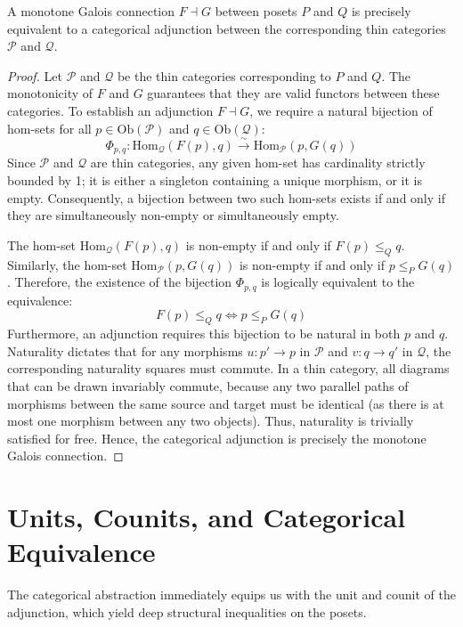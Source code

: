\begin{lemma}
\label{lem:adjunction_thin}
A monotone Galois connection $F \dashv G$ between posets $P$ and $Q$ is precisely equivalent to a categorical adjunction between the corresponding thin categories $\mathcal{P}$ and $\mathcal{Q}$.
\end{lemma}
\begin{proof}
Let $\mathcal{P}$ and $\mathcal{Q}$ be the thin categories corresponding to $P$ and $Q$. The monotonicity of $F$ and $G$ guarantees that they are valid functors between these categories. To establish an adjunction $F \dashv G$, we require a natural bijection of hom-sets for all $p \in \text{Ob}(\mathcal{P})$ and $q \in \text{Ob}(\mathcal{Q})$:
\[ \Phi_{p,q}: \text{Hom}_{\mathcal{Q}}(F(p), q) \xrightarrow{\sim} \text{Hom}_{\mathcal{P}}(p, G(q)) \]
Since $\mathcal{P}$ and $\mathcal{Q}$ are thin categories, any given hom-set has cardinality strictly bounded by 1; it is either a singleton containing a unique morphism, or it is empty. Consequently, a bijection between two such hom-sets exists if and only if they are simultaneously non-empty or simultaneously empty.

The hom-set $\text{Hom}_{\mathcal{Q}}(F(p), q)$ is non-empty if and only if $F(p) \leq_Q q$. 
Similarly, the hom-set $\text{Hom}_{\mathcal{P}}(p, G(q))$ is non-empty if and only if $p \leq_P G(q)$. 
Therefore, the existence of the bijection $\Phi_{p,q}$ is logically equivalent to the equivalence:
\[ F(p) \leq_Q q \iff p \leq_P G(q) \]
Furthermore, an adjunction requires this bijection to be natural in both $p$ and $q$. Naturality dictates that for any morphisms $u: p' \to p$ in $\mathcal{P}$ and $v: q \to q'$ in $\mathcal{Q}$, the corresponding naturality squares must commute. In a thin category, all diagrams that can be drawn invariably commute, because any two parallel paths of morphisms between the same source and target must be identical (as there is at most one morphism between any two objects). Thus, naturality is trivially satisfied for free. Hence, the categorical adjunction is precisely the monotone Galois connection.
\end{proof}

\section{Units, Counits, and Categorical Equivalence}

The categorical abstraction immediately equips us with the unit and counit of the adjunction, which yield deep structural inequalities on the posets.

